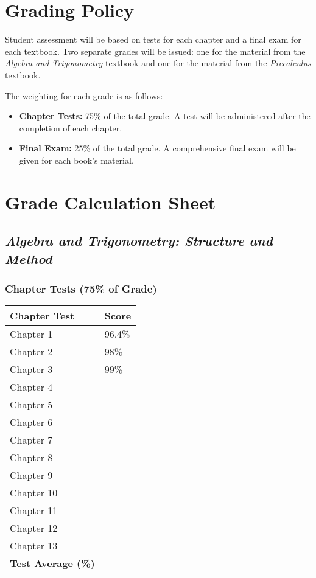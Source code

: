 \documentclass[11pt, letterpaper]{article}
\begin{document}
\section*{Grading Policy}
Student assessment will be based on tests for each chapter and a final exam for each textbook. Two separate grades will be issued: one for the material from the \textit{Algebra and Trigonometry} textbook and one for the material from the \textit{Precalculus} textbook.

The weighting for each grade is as follows:
\begin{itemize}
    \item \textbf{Chapter Tests:} 75\% of the total grade. A test will be administered after the completion of each chapter.
    \item \textbf{Final Exam:} 25\% of the total grade. A comprehensive final exam will be given for each book's material.
\end{itemize}

\newpage
\section*{Grade Calculation Sheet}

\subsection*{\textit{Algebra and Trigonometry: Structure and Method}}
\subsubsection*{Chapter Tests (75\% of Grade)}
\begin{tabular}{|p{6cm}|p{3cm}|}
\hline
\textbf{Chapter Test} & \textbf{Score} \\
\hline
Chapter 1 & 96.4\% \\ \hline
Chapter 2 & 98\% \\ \hline
Chapter 3 & 99\% \\ \hline
Chapter 4 & \\ \hline
Chapter 5 & \\ \hline
Chapter 6 & \\ \hline
Chapter 7 & \\ \hline
Chapter 8 & \\ \hline
Chapter 9 & \\ \hline
Chapter 10 & \\ \hline
Chapter 11 & \\ \hline
Chapter 12 & \\ \hline
Chapter 13 & \\ \hline
\textbf{Test Average (\%)} & \\
\hline
\end{tabular}
\end{document}
